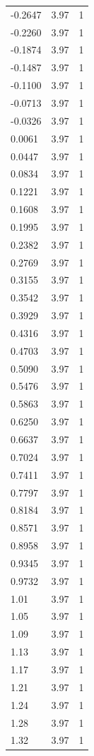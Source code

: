 \begin{longtable}{lrr}
  -0.2647 & 3.97 & 1 \\
  -0.2260 & 3.97 & 1 \\
  -0.1874 & 3.97 & 1 \\
  -0.1487 & 3.97 & 1 \\
  -0.1100 & 3.97 & 1 \\
  -0.0713 & 3.97 & 1 \\
  -0.0326 & 3.97 & 1 \\
  0.0061 & 3.97 & 1 \\
  0.0447 & 3.97 & 1 \\
  0.0834 & 3.97 & 1 \\
  0.1221 & 3.97 & 1 \\
  0.1608 & 3.97 & 1 \\
  0.1995 & 3.97 & 1 \\
  0.2382 & 3.97 & 1 \\
  0.2769 & 3.97 & 1 \\
  0.3155 & 3.97 & 1 \\
  0.3542 & 3.97 & 1 \\
  0.3929 & 3.97 & 1 \\
  0.4316 & 3.97 & 1 \\
  0.4703 & 3.97 & 1 \\
  0.5090 & 3.97 & 1 \\
  0.5476 & 3.97 & 1 \\
  0.5863 & 3.97 & 1 \\
  0.6250 & 3.97 & 1 \\
  0.6637 & 3.97 & 1 \\
  0.7024 & 3.97 & 1 \\
  0.7411 & 3.97 & 1 \\
  0.7797 & 3.97 & 1 \\
  0.8184 & 3.97 & 1 \\
  0.8571 & 3.97 & 1 \\
  0.8958 & 3.97 & 1 \\
  0.9345 & 3.97 & 1 \\
  0.9732 & 3.97 & 1 \\
  1.01 & 3.97 & 1 \\
  1.05 & 3.97 & 1 \\
  1.09 & 3.97 & 1 \\
  1.13 & 3.97 & 1 \\
  1.17 & 3.97 & 1 \\
  1.21 & 3.97 & 1 \\
  1.24 & 3.97 & 1 \\
  1.28 & 3.97 & 1 \\
  1.32 & 3.97 & 1 \\

\end{longtable}
